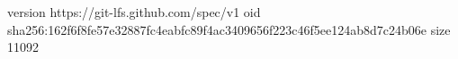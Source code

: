 version https://git-lfs.github.com/spec/v1
oid sha256:162f6f8fe57e32887fc4eabfc89f4ac3409656f223c46f5ee124ab8d7c24b06e
size 11092

